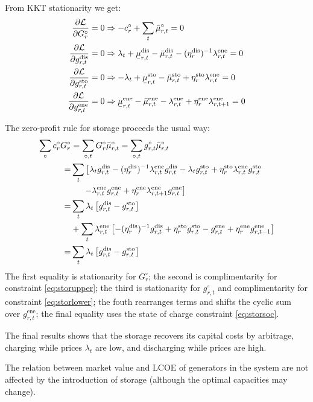 \documentclass[final,3p,times]{elsarticle}
\newcommand{\ubar}[1]{\text{\b{$#1$}}}
\def\l{\lambda}
\def\m{\mu}
\def\d{\partial}
\def\cL{\mathcal{L}}
\begin{document}
From KKT stationarity we get:
\begin{align}
\frac{\d \cL}{\d G^\circ_{r}} = 0 &\Rightarrow - c^\circ_r + \sum_t \bar{\m}^\circ_{r,t}  = 0 \\
    \frac{\d \cL}{\d g^{\textrm{dis}}_{r,t}} = 0 &\Rightarrow  \l_t + \ubar{\m}^{\textrm{dis}}_{r,t} - \bar{\m}^{\textrm{dis}}_{r,t} - (\eta^{\textrm{dis}}_r)^{-1} \l^{\textrm{ene}}_{r,t}  = 0 \\
    \frac{\d \cL}{\d g^{\textrm{sto}}_{r,t}} = 0 &\Rightarrow  -\l_t + \ubar{\m}^{\textrm{sto}}_{r,t} - \bar{\m}^{\textrm{sto}}_{r,t} + \eta^{\textrm{sto}}_r \l^{\textrm{ene}}_{r,t}  = 0 \\
    \frac{\d \cL}{\d g^{\textrm{ene}}_{r,t}} = 0 &\Rightarrow   \ubar{\m}^{\textrm{ene}}_{r,t} - \bar{\m}^{\textrm{ene}}_{r,t} -  \l^{\textrm{ene}}_{r,t} + \eta^{\textrm{ene}}_r \l^{\textrm{ene}}_{r,t+1}   = 0
\end{align}

The zero-profit rule for storage proceeds the usual way:
\begin{align}
  \sum_\circ c^\circ_r G^\circ_r & =  \sum_{\circ,t} G^\circ_r\bar{\m}^\circ_{r,t}  =   \sum_{\circ,t} g^\circ_{r,t}\bar{\m}^\circ_{r,t} \nonumber \\
   = & \sum_t \left[ \l_t g^{\textrm{dis}}_{r,t} -(\eta^{\textrm{dis}}_r)^{-1} \l^{\textrm{ene}}_{r,t}  g^{\textrm{dis}}_{r,t}
  -\l_t g^{\textrm{sto}}_{r,t} + \eta^{\textrm{sto}}_r \l^{\textrm{ene}}_{r,t} g^{\textrm{sto}}_{r,t} \right.\nonumber \\
  & \left. \hspace{.5cm}-\l^{\textrm{ene}}_{r,t}g^{\textrm{ene}}_{r,t} + \eta^{\textrm{ene}}_r \l^{\textrm{ene}}_{r,t+1}g^{\textrm{ene}}_{r,t} \right] \nonumber \\
   = & \sum_t \l_t \left[ g^{\textrm{dis}}_{r,t} - g^{\textrm{sto}}_{r,t}  \right] \nonumber \\
   & + \sum_t  \l^{\textrm{ene}}_{r,t} \left[ -(\eta^{\textrm{dis}}_r)^{-1} g^{\textrm{dis}}_{r,t}+ \eta^{\textrm{sto}}_r  g^{\textrm{sto}}_{r,t} -g^{\textrm{ene}}_{r,t} + \eta^{\textrm{ene}}_r g^{\textrm{ene}}_{r,t-1} \right] \nonumber \\
      = & \sum_t \l_t \left[ g^{\textrm{dis}}_{r,t} - g^{\textrm{sto}}_{r,t}  \right]
\end{align}
The first equality is stationarity for $G^\circ_r$; the second is complimentarity for constraint \eqref{eq:storupper}; the third is stationarity for $g^\circ_{r,t}$ and complimentarity for constraint \eqref{eq:storlower}; the fouth rearranges terms and shifts the cyclic sum over $g^{\textrm{ene}}_{r,t}$; the final equality uses the state of charge constraint \eqref{eq:storsoc}.

The final results shows that the storage recovers its capital costs by arbitrage, charging while prices $\l_t$ are low, and discharging while prices are high.

The relation between market value and LCOE of generators in the system are not affected by the introduction of storage (although the optimal capacities may change).






\end{document}
